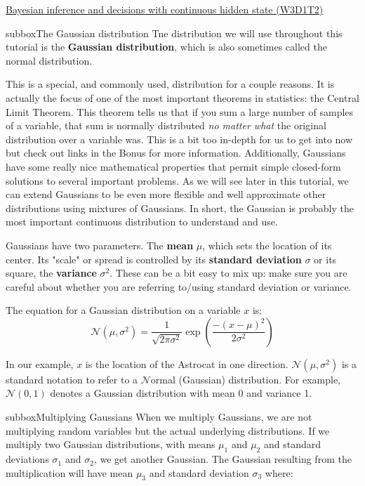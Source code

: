 \begin{textbox}{\href{https://compneuro.neuromatch.io/tutorials/W3D1_BayesianDecisions/student/W3D1_Tutorial2.html}{Bayesian inference and decisions with continuous hidden state (W3D1T2)} }
\begin{subbox}{subbox}{The Gaussian distribution}
\scriptsize
Tne distribution we will use throughout this tutorial is the \textbf{Gaussian distribution}, which is also sometimes called the normal distribution. 

This is a special, and commonly used, distribution for a couple reasons. It is actually the focus of one of the most important theorems in statistics: the Central Limit Theorem. This theorem tells us that if you sum a large number of samples of a variable, that sum is normally distributed \textit{no matter what} the original distribution over a variable was. This is a bit too in-depth for us to get into now but check out links in the Bonus for more information. Additionally, Gaussians have some really nice mathematical properties that permit simple closed-form solutions to several important problems. As we will see later in this tutorial, we can extend Gaussians to be even more flexible and well approximate other distributions using mixtures of Gaussians. In short, the Gaussian is probably the most important continuous distribution to understand and use.

Gaussians have two parameters. The \textbf{mean} $\mu$, which sets the location of its center. Its "scale" or spread is controlled by its \textbf{standard deviation} $\sigma$ or its square, the \textbf{variance} $\sigma^2$. These can be a bit easy to mix up: make sure you are careful about whether you are referring to/using standard deviation or variance.


The equation for a Gaussian distribution on a variable $x$ is:
\begin{equation}
\mathcal{N}(\mu,\sigma^2) = \frac{1}{\sqrt{2\pi\sigma^2}}\exp\left(\frac{-(x-\mu)^2}{2\sigma^2}\right)
\end{equation}

In our example, $x$ is the location of the Astrocat in one direction. $\mathcal{N}(\mu,\sigma^2)$ is a standard notation to refer to a $\mathcal{N}$ormal (Gaussian) distribution. For example, $\mathcal{N}(0, 1)$ denotes a Gaussian distribution with mean 0 and variance 1. 

\end{subbox}

\begin{subbox}{subbox}{Multiplying Gaussians}
\scriptsize
When we multiply Gaussians, we are not multiplying random variables but the actual underlying distributions. If we multiply two Gaussian distributions, with means $\mu_1$ and $\mu_2$ and standard deviations $\sigma_1$ and $\sigma_2$, we get another Gaussian. The Gaussian resulting from the multiplication will have mean $\mu_3$ and standard deviation $\sigma_3$ where:


\end{subbox}
\end{textbox}
